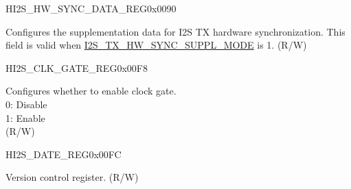 \begin{register}{H}{I2S\_HW\_SYNC\_DATA\_REG}{0x0090}\label{regdesc:I2SHWSYNCDATAREG}
%
\regnewline%
\begin{regdesc}\begin{reglist}
\label{fielddesc:I2STXHWSYNCSUPPLDATA}\item [I2S\_TX\_HW\_SYNC\_SUPPL\_DATA] Configures the supplementation data for I2S TX hardware synchronization. This field is valid when \hyperref[fielddesc:I2STXHWSYNCSUPPLMODE]{I2S\_TX\_HW\_SYNC\_SUPPL\_MODE} is 1. (R/W)
\end{reglist}\end{regdesc}
\end{register}


\begin{register}{H}{I2S\_CLK\_GATE\_REG}{0x00F8}\label{regdesc:I2SCLKGATEREG}
%
%
\regnewline%
\begin{regdesc}\begin{reglist}
\label{fielddesc:I2SCLKEN}\item [I2S\_CLK\_EN] Configures whether to enable clock gate. \\
0: Disable\\
1: Enable\\
(R/W)
\end{reglist}\end{regdesc}
\end{register}


\begin{register}{H}{I2S\_DATE\_REG}{0x00FC}\label{regdesc:I2SDATEREG}
%
%
\regnewline%
\begin{regdesc}\begin{reglist}
\label{fielddesc:I2SDATE}\item [I2S\_DATE] Version control register. (R/W)
\end{reglist}\end{regdesc}
\end{register}
